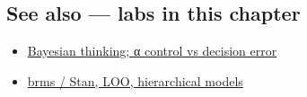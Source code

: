 \documentclass[
]{article}
\providecommand{\tightlist}{%
  \setlength{\itemsep}{0pt}\setlength{\parskip}{0pt}}
\begin{document}
\subsection{See also --- labs in this
chapter}\label{see-also-labs-in-this-chapter}

\begin{itemize}
\tightlist
\item
  \href{labs/lab-bayesian-thinking-control-vs-decision-error.Rmd}{Bayesian
  thinking; α control vs decision error}
\item
  \href{labs/lab-brms-stan-loo-hierarchical-models.Rmd}{brms / Stan,
  LOO, hierarchical models}
\end{itemize}
\end{document}
